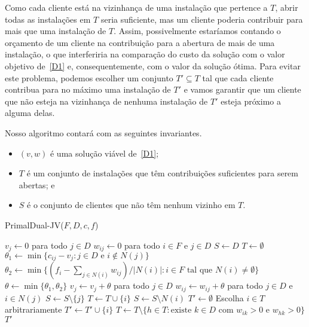Como cada cliente está na vizinhança de uma instalação que pertence a $T$, abrir todas as instalações em $T$ seria suficiente, mas um cliente poderia contribuir para mais que uma instalação de $T$. Assim, possivelmente estaríamos contando o orçamento de um cliente na contribuição para a abertura de mais de uma instalação, o que interferiria na comparação do custo da solução com o valor objetivo de~\eqref{D1} e, consequentemente, com o valor da solução ótima.
Para evitar este problema, podemos escolher um conjunto $T' \subseteq T$ tal que cada cliente contribua para no máximo uma instalação de $T'$ e vamos garantir que um cliente que não esteja na vizinhança de nenhuma instalação de $T'$ esteja próximo a alguma delas.

Nosso algoritmo contará com as seguintes invariantes.
\begin{itemize}
    \item $(v,w)$ é uma solução viável de~\eqref{D1};
    \item $T$ é um conjunto de instalações que têm contribuições suficientes para serem abertas; e
    \item $S$ é o conjunto de clientes que não têm nenhum vizinho em $T$.
\end{itemize}
\begin{algorithm}[tbh] \label{primaldual}
    \caption{\sc PrimalDual-JV(${F,D,c,f}$)}
    \label{fl:primaldual}
    \begin{algorithmic}[1]
        \State $v_j \gets 0$ para todo $j \in D$
        \State $w_{ij} \gets 0$ para todo $i \in F$ e $j \in D$
        \State $S \gets D$
        \State $T \gets \emptyset$
        \State $\theta_1 \gets \min\{c_{ij}-v_j : j \in D \text{ e } i \not\in N(j)\}$ \label{theta1}
        \State $\theta_2 \gets \min\{(f_i - \sum_{j \in N(i)}w_{ij})/|N(i)| : i \in F \text{ tal que } N(i) \neq \emptyset \} \label{theta2}$
        \State $\theta \gets \min\{\theta_1,\theta_2\} \label{theta}$
        \State $v_j \gets v_j + \theta$ para todo $j \in D$
        \State $w_{ij} \gets w_{ij} + \theta$ para todo $j \in D$ e $i \in N(j)$ 
        \State $S \gets S \setminus \{j\}$
        \EndIf
        \State $T \gets T \cup \{i\}$
        \State $S \gets S\setminus N(i)$
        \EndIf
        \EndWhile
        \State $T' \gets \emptyset$
        \State Escolha $i \in T$ arbitrariamente
        \State $T' \gets T' \cup \{i\}$
        \State $T \gets T \setminus \{h \in T : \text{existe $k \in D$ com $w_{ik}> 0 $ e $w_{hk} > 0$} \}$
        \EndWhile
        \State \Return $T'$
    \end{algorithmic}
\end{algorithm}

